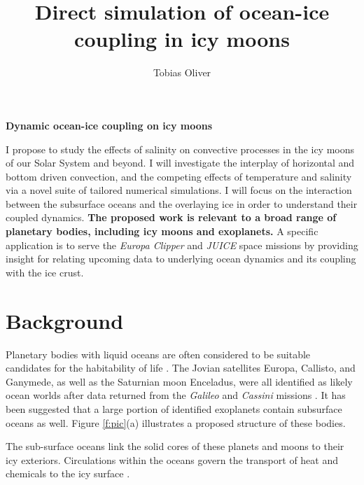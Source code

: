 \documentclass[12pt]{article}
\title{Direct simulation of ocean-ice coupling in icy moons}
\author{Tobias Oliver}
\date{}
\begin{document}
\pagestyle{fancy}
\thispagestyle{fancy}
\fancyhf{} %
\fancyhead[L]{\textcolor{red}{Tobias Oliver\\
Research Proposal}}
\fancyfoot[R]{\thepage}
\newcommand{\citep}[1]{\cite{#1}}
\begin{center}
\large{\textbf{Dynamic ocean-ice coupling on icy moons}}
\end{center}

I propose to study the effects of salinity on convective processes in the icy moons of our Solar System and beyond. 
I will investigate the interplay of horizontal and bottom driven convection, and the competing effects of temperature and salinity via a novel suite of tailored numerical simulations. 
I will focus on the interaction between the subsurface oceans and the overlaying ice in order to understand their coupled dynamics. 
\textbf{The proposed work is relevant to a broad range of planetary bodies, including icy moons and exoplanets.} A specific application is to serve the \textit{Europa Clipper} and \textit{JUICE} space missions by providing insight for relating upcoming data to underlying ocean dynamics and its coupling with the ice crust.

\section{Background}
Planetary bodies with liquid oceans are often considered to be suitable candidates for the habitability of life \citep{tB24}.
The Jovian satellites Europa, Callisto, and Ganymede, as well as the Saturnian moon Enceladus, were all identified as likely ocean worlds after data returned from the \textit{Galileo} and \textit{Cassini} missions \citep{fN16}. It has been suggested that a large portion of identified exoplanets contain subsurface oceans as well\citep{lQ20}.
Figure \ref{f:pic}(a) illustrates a proposed structure of these bodies. 

The sub-surface oceans link the solid cores of these planets and moons to their icy exteriors. Circulations within the oceans govern the transport of heat and chemicals to the icy surface \citep{kS20}. 
\end{document}
